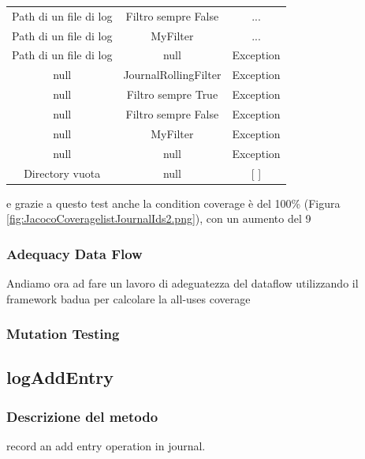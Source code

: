 \documentclass[12pt, a4paper]{article}
\begin{document}
\begin{table}[ht]
\begin{tabular}{|c|c|c|}
  {Path di un file di log} & Filtro sempre False & ... \\
  {Path di un file di log} & MyFilter & ... \\
  {Path di un file di log} & null & Exception \\
  null & JournalRollingFilter & Exception \\
  null & Filtro sempre True & Exception \\
  null & Filtro sempre False & Exception \\
  null & MyFilter & Exception \\
  null & null & Exception \\
  {Directory vuota} & null & [ ] \\
  \hline
  \end{tabular}
  \end{table}

e grazie a questo test anche la condition coverage è del 100\% (Figura \ref{fig:JacocoCoveragelistJournalIds2.png}),
 con un aumento del 9%

 \subsubsection{Adequacy Data Flow}

 Andiamo ora ad fare un lavoro di adeguatezza del dataflow utilizzando il framework badua per calcolare la all-uses coverage

 \subsubsection{Mutation Testing}




















\subsection{logAddEntry}
\subsubsection{Descrizione del metodo}
record an add entry operation in journal.
\end{document}
